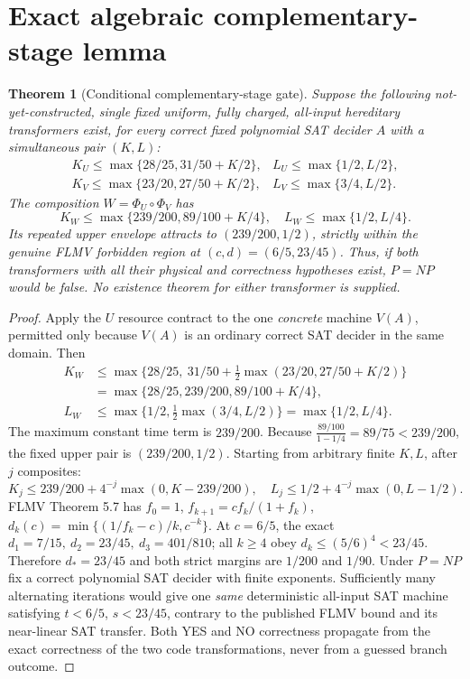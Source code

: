 \documentclass[11pt]{article}
\newtheorem{theorem}{Theorem}
\begin{document}
\section{Exact algebraic complementary-stage lemma}
\begin{theorem}[Conditional complementary-stage gate]
Suppose the following \emph{not-yet-constructed}, single fixed uniform, fully charged, all-input hereditary transformers exist, for \emph{every} correct fixed polynomial SAT decider $A$ with a simultaneous pair $(K,L)$:
\[
\begin{array}{ll}
K_U\le\max\{28/25,31/50+K/2\},&
L_U\le\max\{1/2,L/2\},\\
K_V\le\max\{23/20,27/50+K/2\},&
L_V\le\max\{3/4,L/2\}.
\end{array}\tag{1}
\]
The composition $W=\Phi_U\circ\Phi_V$ has
\[
\boxed{K_W\le\max\{239/200,89/100+K/4\},\quad L_W\le\max\{1/2,L/4\}.}\tag{2}
\]
Its repeated upper envelope attracts to $(239/200,1/2)$, strictly within the genuine FLMV forbidden region at $(c,d)=(6/5,23/45)$. Thus, \emph{if both transformers with all their physical and correctness hypotheses exist}, $P=NP$ would be false. No existence theorem for either transformer is supplied.
\end{theorem}
\begin{proof}
Apply the $U$ resource contract to the one \emph{concrete} machine $V(A)$, permitted only because $V(A)$ is an ordinary correct SAT decider in the same domain. Then
\[
\begin{aligned}
K_W&\le\max\{28/25,\ 31/50+\tfrac12\max(23/20,27/50+K/2)\}\\
&=\max\{28/25,239/200,89/100+K/4\},\\
L_W&\le\max\{1/2,\tfrac12\max(3/4,L/2)\}=\max\{1/2,L/4\}.
\end{aligned}
\]
The maximum constant time term is $239/200$. Because $\frac{89/100}{1-1/4}=89/75<239/200$, the fixed upper pair is $(239/200,1/2)$. Starting from arbitrary finite $K,L$, after $j$ composites:
\[
K_j\le239/200+4^{-j}\max(0,K-239/200),\quad
L_j\le1/2+4^{-j}\max(0,L-1/2).
\]
FLMV Theorem 5.7 has $f_0=1$, $f_{k+1}=cf_k/(1+f_k)$,
$d_k(c)=\min\{(1/f_k-c)/k,c^{-k}\}$. At $c=6/5$, the exact
$d_1=7/15,\ d_2=23/45,\ d_3=401/810$; all $k\ge4$ obey
$d_k\le(5/6)^4<23/45$. Therefore $d_*=23/45$ and both strict margins are $1/200$ and $1/90$. Under $P=NP$ fix a correct polynomial SAT decider with finite exponents. Sufficiently many alternating iterations would give one \emph{same} deterministic all-input SAT machine satisfying $t<6/5$, $s<23/45$, contrary to the published FLMV bound and its near-linear SAT transfer. Both YES and NO correctness propagate from the exact correctness of the two code transformations, never from a guessed branch outcome.
\end{proof}
\end{document}
